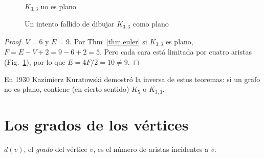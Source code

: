 \begin{figure}[t]
\begin{minipage}{.45\textwidth}
\begin{center}
\caption{$K_{3,3}$ no es plano}\label{f.five-k33}
\end{center}
\end{minipage}
\hfill
\begin{minipage}{.45\textwidth}
\begin{center}
\caption{Un intento fallido de dibujar $K_{3,3}$ como plano}\label{f.five-k33-failed}
\end{center}
\end{minipage}
\end{figure}
\begin{proof}
$V=6$ y $E=9$. Por Thm~\ref{thm.euler} si $K_{3,3}$ es plano, $F=E-V+2=9-6+2=5$. Pero cada cara está limitada por cuatro aristas (Fig.~\ref{f.five-k33-failed}), por lo que $E=4F/2=10\neq 9$.
\end{proof}

En 1930 Kazimierz Kuratowski demostró la inversa de estos teoremas: si un grafo no es plano, contiene (en cierto sentido) $K_5$ o $K_{3,3}$.


\section{Los grados de los vértices}\label{s.degrees}

\begin{definition}
$d(v)$, el \emph{grado} del vértice $v$, es el número de aristas incidentes a $v$.
\end{definition}

